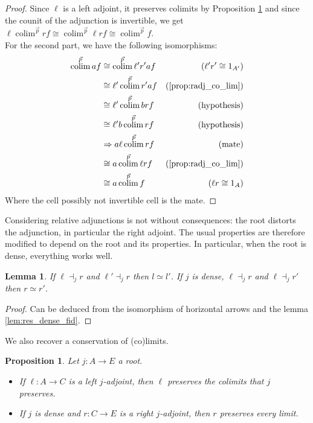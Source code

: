 \documentclass[10pt,a4paper]{article}
\newcommand{\To}{\Rightarrow}
\newcommand{\simeqq}{\cong}
\DeclareMathOperator{\colim}{colim}
\theoremstyle{plain}
\newtheorem{proposition}[theorem]{Proposition}
\newtheorem{lemma}[theorem]{Lemma}
\theoremstyle{definition}
\theoremstyle{remark}
\begin{document}
\begin{proof}
    Since $\ell$ is a left adjoint, it preserves colimits by Proposition \ref{prop:radj_co_lim} and since the counit of the adjunction is invertible, we get $\ell\colim^{\vec p}rf \simeqq \colim^{\vec p}\ell rf\simeqq \colim^{\vec p}f$.\\
    For the second part, we have the following isomorphisms:
    \begin{align*}
        \colim^{\vec p}af &\simeqq \colim^{\vec p}\ell'r'af & (\ell'r'\simeqq 1_{A'})\\
                          &\simeqq \ell'\colim^{\vec p}r'af & (\ref{prop:radj_co_lim})\\
                          &\simeqq \ell'\colim^{\vec p}brf & (\text{hypothesis})\\
                          &\simeqq \ell'b\colim^{\vec p}rf & (\text{hypothesis})\\
                          &\To a\ell\colim^{\vec p}rf & (\text{mate})\\
                          &\simeqq a\colim^{\vec p}\ell rf & (\ref{prop:radj_co_lim})\\
                          &\simeqq a\colim^{\vec p}f & (\ell r\simeqq 1_A)
    \end{align*}
    Where the cell possibly not invertible cell is the mate.
\end{proof}

Considering relative adjunctions is not without consequences: the root distorts the adjunction, in particular the right adjoint. The usual properties are therefore modified to depend on the root and its properties. In particular, when the root is dense, everything works well.

\begin{lemma}
    If $\ell \dashv_j r$ and $\ell' \dashv_j r$ then $l \simeq l'$. If $j$ is dense, $\ell \dashv_j r$ and $\ell \dashv_j r'$ then $r\simeq r'$.
\end{lemma}

\begin{proof}
    Can be deduced from the isomorphism of horizontal arrows and the lemma \ref{lem:res_dense_fid}.
\end{proof}

We also recover a conservation of (co)limits.

\begin{proposition}
    \label{prop:radj_co_lim}
    Let $j : A \to E$ a root.
    \begin{itemize}
        \item If $\ell : A \to C$ is a left $j$-adjoint, then $\ell$ preserves the colimits that $j$ preserves.
        \item If $j$ is dense and $r : C \to E$ is a right $j$-adjoint, then $r$ preserves every limit.
    \end{itemize}
\end{proposition}
\end{document}
